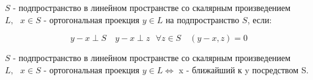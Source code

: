 \documentclass[12pt, a4paper]{report}
\begin{document}
\begin{definition}
    \( S  \)  - подпространство в линейном пространстве со скалярным произведением \( L, \text{ } x \in  S   \)  - ортогональная проекция \(  y \in  L   \)  на подпространство \( S  \), если: 

    \[ y- x \perp  S \quad  y -x \perp  z \text{ }  \forall  z \in  S \quad  ( y - x , z ) = 0  \] 

\end{definition}


\begin{lemma}
    \( S  \)  - подпространство в линейном пространстве со скалярным произведением \( L, \text{ }  x \in  S  \)  - ортогональная проекция \(  y \in  L  \Leftrightarrow   \)   x - ближайший к y посредством S.
\end{lemma}
\end{document}
